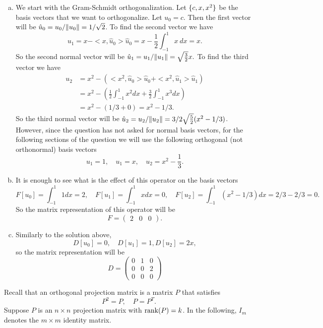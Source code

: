 \begin{solution}
	\begin{enumerate}[(a)]
		\item We start with the Gram-Schmidt orthogonalization. Let $ \{c,x,x^2\} $ be the basis vectors that we want to orthogonalize. Let $ u_0 = c $. Then the first vector will be $ \hat{u}_0 = u_0/\norm{u_0} = 1/\sqrt{2}  $. To find the second vector we have
		\[ u_1 = x - <x,\hat{u}_0>\hat{u}_0 = x - \frac{1}{2}\int_{-1}^{1}x\ dx  = x. \]
		So the second normal vector will be $ \hat{u}_1 = u_1 / \norm{u_1} = \sqrt{\frac{3}{2}}x. $ To find the third vector we have
		\begin{align*}
			u_2 &= x^2 - (<x^2,\hat{u}_0>\hat{u}_0 + <x^2,\hat{u}_1>\hat{u}_1) \\
			&= x^2 - (\frac{1}{2}\int_{-1}^{1}x^2 dx + \frac{3}{2}\int_{-1}^{1}x^3 dx)  \\
			&= x^2 - (1/3 + 0) = x^2 - 1/3.
		\end{align*}
		So the third normal vector will be $ \hat{u}_2 = u_2 / \norm{u_2} = 3/2\sqrt{\frac{5}{2}}(x^2 - 1/3) $. However, since the question has not asked for normal basis vectors, for the following sections of the question we will use the following orthogonal (not orthonormal) basis vectors
		\[ u_1 = 1,\quad u_1 = x,\quad u_2 = x^2 - \frac{1}{3}. \]
		
		\item It is enough to see what is the effect of this operator on the basis vectors
		\[ F[u_0] = \int_{-1}^{1} 1 dx = 2, \quad F[u_1] = \int_{-1}^{1} x dx = 0,\quad F[u_2] = \int_{-1}^{1} (x^2 - 1/3)dx = 2/3 - 2/3 = 0. \]
		So the matrix representation of this operator will be
		\[ F = \begin{pmatrix}
			2 & 0 & 0
		\end{pmatrix}. \]
		
		\item Similarly to the solution above, 
		\[ D[u_0] = 0, \quad D[u_1] = 1, D[u_2] = 2x, \]
		so the matrix representation will be 
		\[ D = \begin{pmatrix}
			0 & 1 & 0 \\
			0 & 0 & 2 \\
			0 & 0 & 0
		\end{pmatrix} \]
	\end{enumerate}
\end{solution}

\begin{problem}
	Recall that an orthogonal projection matrix is a matrix $ P $ that satisfies 
	\[ P^2 = P, \quad P = P^T. \]
	Suppose $ P $ is an $ n\times n $ projection matrix with $ \rank(P) = k $. In the following, $ I_m $ denotes the $ m\times m $ identity matrix. 
\end{problem}
